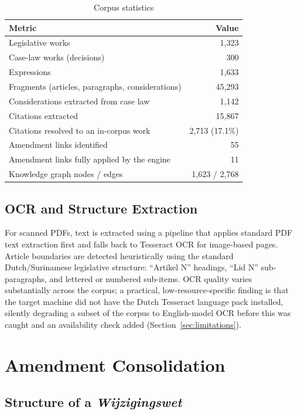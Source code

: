 \documentclass{IOS-Book-Article}
\begin{document}
\begin{table}[h]
\caption{Corpus statistics}
\label{tab:stats}
\begin{tabular}{|l|r|}
\hline
\textbf{Metric} & \textbf{Value} \\
\hline
Legislative works & 1,323 \\
Case-law works (decisions) & 300 \\
Expressions & 1,633 \\
Fragments (articles, paragraphs, considerations) & 45,293 \\
Considerations extracted from case law & 1,142 \\
Citations extracted & 15,867 \\
Citations resolved to an in-corpus work & 2,713 (17.1\%) \\
Amendment links identified & 55 \\
Amendment links fully applied by the engine & 11 \\
Knowledge graph nodes / edges & 1,623 / 2,768 \\
\hline
\end{tabular}
\end{table}

\subsection{OCR and Structure Extraction}

For scanned PDFs, text is extracted using a pipeline that applies standard PDF text
extraction first and falls back to Tesseract OCR for image-based pages. Article boundaries
are detected heuristically using the standard Dutch/Surinamese legislative structure:
``Artikel N'' headings, ``Lid N'' sub-paragraphs, and lettered or numbered sub-items. OCR quality
varies substantially across the corpus; a practical, low-resource-specific finding is that
the target machine did not have the Dutch Tesseract language pack installed, silently
degrading a subset of the corpus to English-model OCR before this was caught and an
availability check added (Section~\ref{sec:limitations}).

\section{Amendment Consolidation}
\label{sec:consolidation}

\subsection{Structure of a \emph{Wijzigingswet}}
\end{document}
